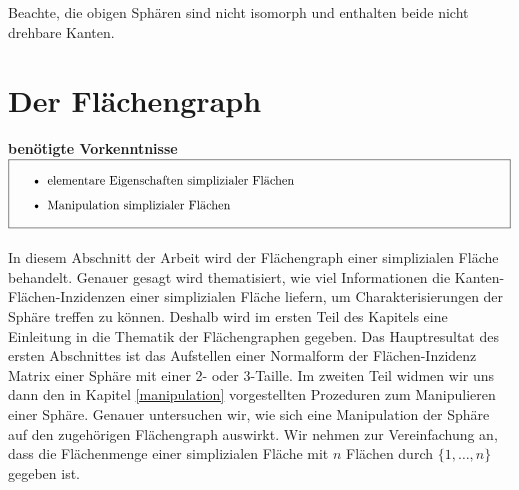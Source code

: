 \documentclass[12pt,titlepage,twoside,cleardoublepage]{article}
\theoremstyle{nummermitklammern}
\numberwithin{equation}{section}
\begin{document}
Beachte, die obigen Sphären sind nicht isomorph und enthalten beide nicht drehbare Kanten.

\section{Der Flächengraph}
\textbf{benötigte Vorkenntnisse}\\
$\fbox{
\parbox{14cm}{\begin{itemize} 
\item elementare Eigenschaften simplizialer Fl\"achen
\item Manipulation simplizialer Fl\"achen
\end{itemize}
}}$\\\\
In diesem Abschnitt der Arbeit wird der Flächengraph einer simplizialen Fläche behandelt. Genauer gesagt wird thematisiert, wie viel Informationen die Kanten-Flächen-Inzidenzen einer simplizialen Fläche liefern, um Charakterisierungen der Sphäre treffen zu können. Deshalb wird im ersten Teil des Kapitels eine Einleitung in die Thematik der Flächengraphen gegeben. Das Hauptresultat des ersten Abschnittes ist das Aufstellen einer Normalform der Flächen-Inzidenz Matrix einer Sphäre mit einer 2- oder 3-Taille. Im zweiten Teil widmen wir uns dann den in Kapitel \ref{manipulation} vorgestellten Prozeduren zum Manipulieren einer Sphäre. Genauer untersuchen wir, wie sich eine Manipulation der Sphäre auf den zugehörigen Flächengraph auswirkt.  
Wir nehmen zur Vereinfachung an, dass die Flächenmenge einer simplizialen Fläche mit $n$ Flächen  durch $\{1,\ldots,n\}$ gegeben ist.
\end{document}
